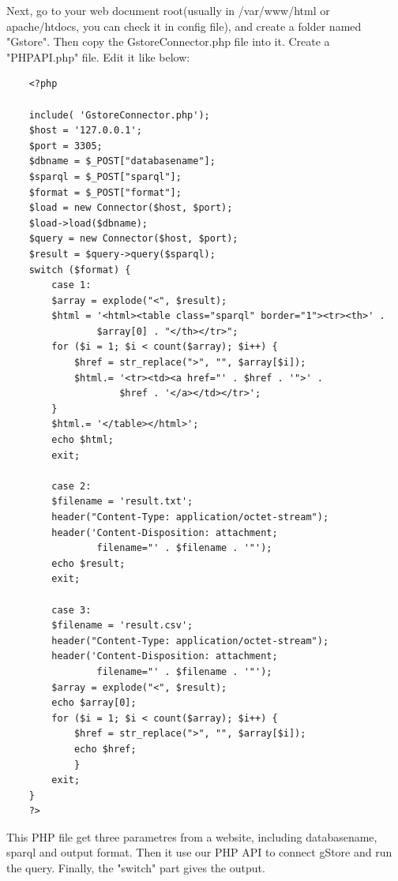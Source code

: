 \documentclass[titlepage, a4paper, 12pt]{article}
\begin{document}
	Next, go to your web document root(usually in /var/www/html or apache/htdocs, you can check it in config file), and create a folder named "Gstore". Then copy the GstoreConnector.php file into it. Create a "PHPAPI.php" file. Edit it like below:

	\begin{verbatim}
	<?php

	include( 'GstoreConnector.php');
	$host = '127.0.0.1';
	$port = 3305;
	$dbname = $_POST["databasename"];
	$sparql = $_POST["sparql"];
	$format = $_POST["format"];
	$load = new Connector($host, $port);
	$load->load($dbname);
	$query = new Connector($host, $port);
	$result = $query->query($sparql);
	switch ($format) {
    	case 1:
        $array = explode("<", $result);
        $html = '<html><table class="sparql" border="1"><tr><th>' . 
                $array[0] . "</th></tr>";
        for ($i = 1; $i < count($array); $i++) {
            $href = str_replace(">", "", $array[$i]);
            $html.= '<tr><td><a href="' . $href . '">' . 
                    $href . '</a></td></tr>';
        }
        $html.= '</table></html>';
        echo $html;
        exit;

    	case 2:
        $filename = 'result.txt';
        header("Content-Type: application/octet-stream");
        header('Content-Disposition: attachment; 
                filename="' . $filename . '"');
        echo $result;
        exit;

    	case 3:
        $filename = 'result.csv';
        header("Content-Type: application/octet-stream");
        header('Content-Disposition: attachment; 
                filename="' . $filename . '"');
        $array = explode("<", $result);
        echo $array[0];
        for ($i = 1; $i < count($array); $i++) {
            $href = str_replace(">", "", $array[$i]);
            echo $href;
        	}
        exit;
	}
	?>
	\end{verbatim}

	This PHP file get three parametres from a website, including databasename, sparql and output format. Then it use our PHP API to connect gStore and run the query. Finally, the "switch" part gives the output. 
\end{document}
